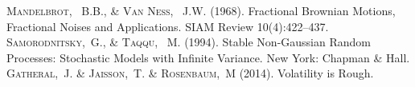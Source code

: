 \documentclass[]{beamer}
\begin{document}
\begin{thebibliography}{99}
 \textsc{Mandelbrot, ~B.B., \& Van Ness, ~J.W.} (1968). Fractional Brownian Motions, Fractional Noises and Applications. SIAM Review 10(4):422–437.
   \textsc{Samorodnitsky,~G., \& Taqqu, ~M.} (1994). Stable Non-Gaussian Random Processes: Stochastic Models with Infinite Variance. New York: Chapman \& Hall.
	 \textsc{Gatheral,~J. \& Jaisson,~T. \& Rosenbaum,~M} (2014). Volatility is Rough.
  \end{thebibliography}
\end{document}
